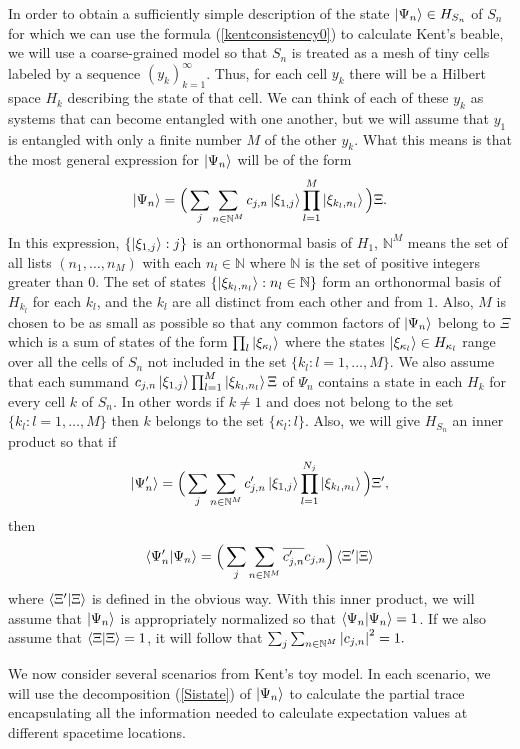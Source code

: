 In order to obtain a sufficiently simple description of the state $\ket{\Psi_n}\in H_{S_n}$ of $S_n$ for which we can use the formula (\ref{kentconsistency0}) to calculate Kent's beable, we will  
use a coarse-grained model so that $S_n$ is treated as a mesh of tiny cells labeled by a sequence $(y_k)_{k=1}^\infty$. Thus, for each cell $y_k$ there will be a Hilbert space $H_k$ describing the state of that cell. We can think of each of these $y_k$ as systems that can become entangled with one another, but we will assume that $y_1$ is entangled with only a finite number $M$ of the other $y_k$. What this means is that the most general expression for $\ket{\Psi_n}$ will be of the form
\begin{equation}\label{Sistate}
\ket{\Psi_n}=\Big(\sum_j\sum_{n\in\mathbb{N}^M} c_{j,n}\ket{\xi_{1,j}}\prod_{l=1}^{M}\ket{\xi_{k_{l},n_l}}\Big)\Xi.
\end{equation}
In this expression, $\{\ket{\xi_{1,j}}:j\}$ is an orthonormal basis of $H_1$, $\mathbb{N}^M$ means the set of all lists $(n_1,\ldots,n_M)$ with each $n_l\in\mathbb{N}$ where $\mathbb{N}$ is the set of positive integers greater than 0. The set of states $\{\ket{\xi_{k_{l},n_l}}:n_l\in\mathbb{N}\}$ form an orthonormal basis of $H_{k_{l}}$ for each $k_l$, and the $k_{l}$ are all distinct from each other and from $1$. Also, $M$ is chosen to be as small as possible so that any common factors of $\ket{\Psi_n}$ belong to $\Xi$ which is a sum of states of the form $\prod_l\ket{\xi_{\kappa_l}}$ where the states $\ket{\xi_{\kappa_l}}\in H_{\kappa_l}$ range over all the cells of $S_n$ not included in the set $\{k_{l}:l=1,\ldots,M\}.$ We also assume that each summand $c_{j,n}\ket{\xi_{1,j}}\prod_{l=1}^{M}\ket{\xi_{k_{l},n_l}}\Xi$ of $\Psi_n$ contains a state in each $H_k$ for every cell $k$ of $S_n$. In other words if $k\neq 1$ and does not belong to the set $\{k_{l}:l=1,\ldots,M\}$ then $k$ belongs to the set $\{\kappa_l:l\}$. Also, we will give $H_{S_n}$ an inner product so that if 
$$ \ket{\Psi_n'}=\Big(\sum_j\sum_{n\in\mathbb{N}^M} c'_{j,n}\ket{\xi_{1,j}}\prod_{l=1}^{N_j}\ket{\xi_{k_{l},n_l}}\Big)\Xi',$$ then
$$\ip{\Psi_n'}{\Psi_n}=\Big(\sum_j\sum_{n\in\mathbb{N}^M} \overline{c'_{j,n}}c_{j,n} \Big) \ip{\Xi'}{\Xi}$$
where $\ip{\Xi'}{\Xi}$ is defined in the obvious way. With this inner product, we will assume that $\ket{\Psi_n}$ is appropriately normalized so that $\ip{\Psi_n}{\Psi_n}=1$. If we also assume that  $\ip{\Xi}{\Xi}=1$, it will follow that $\sum_j\sum_{n\in\mathbb{N}^M}\abs{c_{j,n}}^2=1.$

We now consider several scenarios from Kent's toy model. In each scenario, we will use the decomposition (\ref{Sistate}) of $\ket{\Psi_n}$ to calculate the partial trace encapsulating all the information needed to calculate expectation values at different spacetime locations. 

